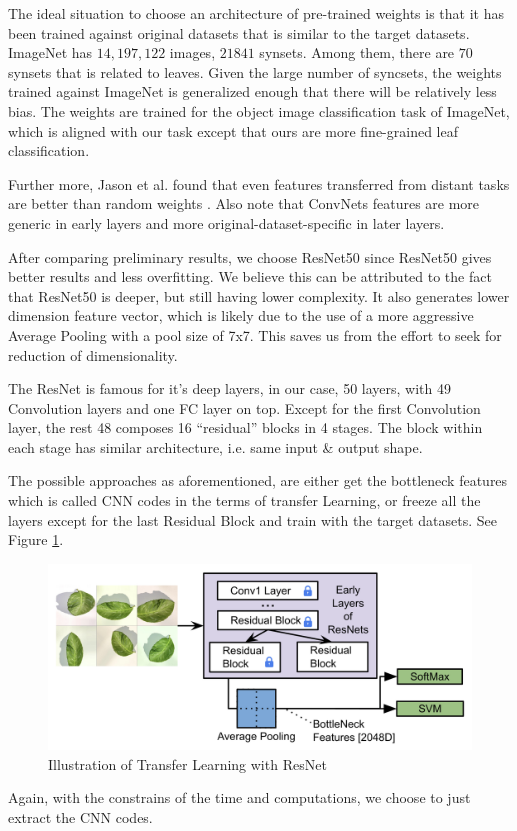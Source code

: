 \documentclass[journal, 10pt]{IEEEtran}
\begin{document}
  The ideal situation to choose an architecture of pre-trained weights is that it has been trained against original datasets that is similar to the target datasets. ImageNet has $14,197,122$ images, $21841$ synsets. Among them, there are $70$ synsets that is related to leaves. Given the large number of syncsets, the weights trained against ImageNet is generalized enough that there will be relatively less bias. The weights are trained for the object image classification task of ImageNet, which is aligned with our task except that ours are more fine-grained leaf classification.

  Further more, Jason et al. found that even features transferred from distant tasks are better than random weights \cite{Jason2014}. Also note that ConvNets features are more generic in early layers and more original-dataset-specific in later layers\cite{CS231N}.

  After comparing preliminary results, we choose ResNet50 since ResNet50 gives better results and less overfitting. We believe this can be attributed to the fact that ResNet50 is deeper, but still having lower complexity\cite{ResNet}. It also generates lower dimension feature vector, which is likely due to the use of a more aggressive Average Pooling with a pool size of 7x7. This saves us from the effort to seek for reduction of dimensionality.


  The ResNet is famous for it's deep layers\cite{ResNet}, in our case, 50 layers, with 49 Convolution layers and one FC layer on top. Except for the first Convolution layer, the rest 48 composes 16 ``residual'' blocks in 4 stages. The block within each stage has similar architecture, i.e. same input \& output shape. \par

  The possible approaches as aforementioned, are either get the bottleneck features which is called CNN codes in the terms of transfer Learning, or freeze all the layers except for the last Residual Block and train with the target datasets. See Figure \ref{fig:tl_resnet}.

  \begin{figure}[H]
    \centering
    \includegraphics[scale=0.23]{TL_ResNet}
    \caption{ Illustration of Transfer Learning with ResNet }
    \label{fig:tl_resnet}
  \end{figure}
  Again, with the constrains of the time and computations, we choose to just extract the CNN codes.
\end{document}
